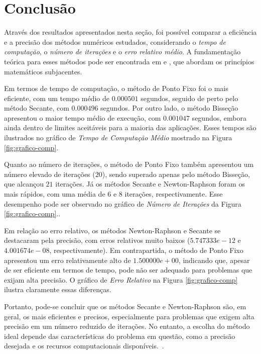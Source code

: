 \section{Conclusão}

Através dos resultados apresentados nesta seção, foi possível comparar a
eficiência e a precisão dos métodos numéricos estudados, considerando o
\textit{tempo de computação}, o \textit{número de iterações} e o \textit{erro
relativo médio}. A fundamentação teórica para esses métodos pode ser encontrada
em \cite{bartle1983elementos} e \cite{ruggiero1996calculo}, que abordam os
princípios matemáticos subjacentes.

Em termos de tempo de computação, o método de Ponto Fixo foi o mais eficiente,
com um tempo médio de $0.000501$ segundos, seguido de perto pelo método Secante,
com $0.000496$ segundos. Por outro lado, o método Bisseção apresentou o maior
tempo médio de execução, com $0.001047$ segundos, embora ainda dentro de limites
aceitáveis para a maioria das aplicações. Esses tempos são ilustrados no gráfico
de \textit{Tempo de Computação Médio} mostrado na Figura \ref{fig:grafico-comp}.

Quanto ao número de iterações, o método de Ponto Fixo também apresentou um
número elevado de iterações ($20$), sendo superado apenas pelo método Bisseção,
que alcançou $21$ iterações. Já os métodos Secante e Newton-Raphson foram os
mais rápidos, com uma média de $6$ e $8$ iterações, respectivamente. Esse
desempenho pode ser observado no gráfico de \textit{Número de Iterações} da
Figura \ref{fig:grafico-comp}.\cite{rudin1976principles}.

Em relação ao erro relativo, os métodos Newton-Raphson e Secante se destacaram
pela precisão, com erros relativos muito baixos ($5.747333e-12$ e
$4.001674e-08$, respectivamente). Em contrapartida, o método de Ponto Fixo
apresentou um erro relativamente alto de $1.500000e+00$, indicando que, apesar
de ser eficiente em termos de tempo, pode não ser adequado para problemas que
exijam alta precisão. O gráfico de \textit{Erro Relativo} na Figura
\ref{fig:grafico-comp} ilustra claramente essas diferenças.

Portanto, pode-se concluir que os métodos Secante e Newton-Raphson são, em
geral, os mais eficientes e precisos, especialmente para problemas que exigem
alta precisão em um número reduzido de iterações. No entanto, a escolha do
método ideal depende das características do problema em questão, como a precisão
desejada e os recursos computacionais
disponíveis.\cite{anton2014calculo}~\cite{dequadros2009fundamentos}.
